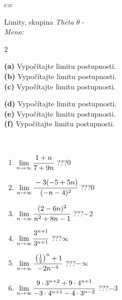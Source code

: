 \documentclass[10pt]{report}
\begin{document}
\newpage
\thispagestyle{empty}
\begin{tabular}{c:c}
\begin{minipage}[c][104.5mm][t]{0.5\linewidth}
\begin{center}
\vspace{5mm}
{\huge Limity, skupina \textit{Theta $\theta$} -}\\[5mm]
\textit{Meno:}\phantom{xxxxxxxxxxxxxxxxxxxxxxxxxxxxxxxxxxxxxxxxxxxxxxxxxxxxxxxxxxxxxxxxx}\\[5mm]
\begin{minipage}{0.95\linewidth}
\begin{center}
{\small \begin{multicols}{2} \raggedright
\textbf{(a)} Vypočítajte limitu postupnosti. \\[1mm]
\textbf{(b)} Vypočítajte limitu postupnosti. \\[1mm]
\textbf{(c)} Vypočítajte limitu postupnosti. \par \columnbreak
\textbf{(d)} Vypočítajte limitu postupnosti. \\[1mm]
\textbf{(e)} Vypočítajte limitu postupnosti. \\[1mm]
\textbf{(f)} Vypočítajte limitu postupnosti.
\end{multicols}
}
\end{center}
\end{minipage}
\\[1mm]
\begin{minipage}{0.79\linewidth}
\begin{center}
\begin{varwidth}{\linewidth}
\setlength{\itemsep}{0pt}
\begin{enumerate}
\footnotesizerr
\item $\lim\limits_{n\to\infty}\cfrac{1+n}{7+9n}$\quad \dotfill\; ???\;\dotfill \quad $0$
\item $\lim\limits_{n\to\infty}\cfrac{-3(-5+5n)}{(-n-4)^2}$\quad \dotfill\; ???\;\dotfill \quad $0$
\item $\lim\limits_{n\to\infty}\cfrac{(2-6n)^2}{n^2+8n-1}$\quad \dotfill\; ???\;\dotfill \quad $-2$
\item $\lim\limits_{n\to\infty}\cfrac{3^{n+1}}{3^{n+1}}$\quad \dotfill\; ???\;\dotfill \quad $\infty$
\item $\lim\limits_{n\to\infty}\cfrac{\left(\frac{1}{2}\right)^n +1}{-2n^{-4}}$\quad \dotfill\; ???\;\dotfill \quad $-\infty$
\item $\lim\limits_{n\to\infty}\cfrac{9\cdot 3^{n+2}+9\cdot 4^{n+1}}{-3\cdot 4^{n+1}-4\cdot 3^{n-2}}$\quad \dotfill\; ???\;\dotfill \quad $-3$

\end{enumerate}
\end{varwidth}
\end{center}
\end{minipage}
\end{center}
\end{minipage}
\end{tabular}
\end{document}
